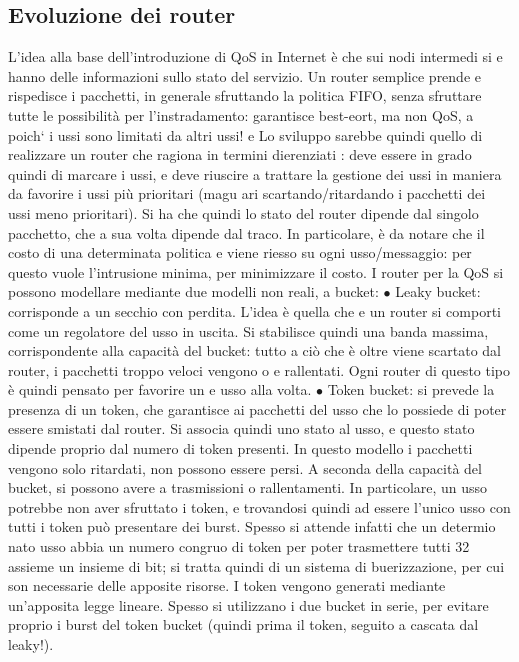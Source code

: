 \subsection{Evoluzione dei router}
L'idea alla base dell'introduzione di QoS in Internet è che sui nodi intermedi si
e
hanno delle informazioni sullo stato del servizio. Un router semplice prende e
rispedisce i pacchetti, in generale sfruttando la politica FIFO, senza sfruttare
tutte le possibilità per l'instradamento: garantisce best-eort, ma non QoS,
a
poich` i ussi sono limitati da altri ussi!
e
Lo sviluppo sarebbe quindi quello di realizzare un router che ragiona in termini dierenziati : deve essere in grado
quindi di marcare i ussi, e deve riuscire
a trattare la gestione dei ussi in maniera da favorire i ussi più prioritari (magu
ari scartando/ritardando i pacchetti dei ussi meno prioritari). Si ha che quindi
lo stato del router dipende dal singolo pacchetto, che a sua volta dipende dal
traco. In particolare, è da notare che il costo di una determinata politica
e
viene riesso su ogni usso/messaggio: per questo vuole l'intrusione minima,
per minimizzare il costo.
I router per la QoS si possono modellare mediante due modelli non reali, a
bucket:
$\bullet$ Leaky bucket: corrisponde a un secchio con perdita. L'idea è quella che
e
un router si comporti come un regolatore del usso in uscita. Si stabilisce
quindi una banda massima, corrispondente alla capacità del bucket: tutto
a
ciò che è oltre viene scartato dal router, i pacchetti troppo veloci vengono
o
e
rallentati. Ogni router di questo tipo è quindi pensato per favorire un
e
usso alla volta.
$\bullet$ Token bucket: si prevede la presenza di un token, che garantisce ai pacchetti del usso che lo possiede di
poter essere smistati dal router. Si associa
quindi uno stato al usso, e questo stato dipende proprio dal numero di
token presenti. In questo modello i pacchetti vengono solo ritardati, non
possono essere persi. A seconda della capacità del bucket, si possono avere
a
trasmissioni o rallentamenti. In particolare, un usso potrebbe non aver
sfruttato i token, e trovandosi quindi ad essere l'unico usso con tutti i
token può presentare dei burst. Spesso si attende infatti che un determio
nato usso abbia un numero congruo di token per poter trasmettere tutti
32
assieme un insieme di bit; si tratta quindi di un sistema di buerizzazione,
per cui son necessarie delle apposite risorse. I token vengono generati
mediante un'apposita legge lineare.
Spesso si utilizzano i due bucket in serie, per evitare proprio i burst del token
bucket (quindi prima il token, seguito a cascata dal leaky!).
